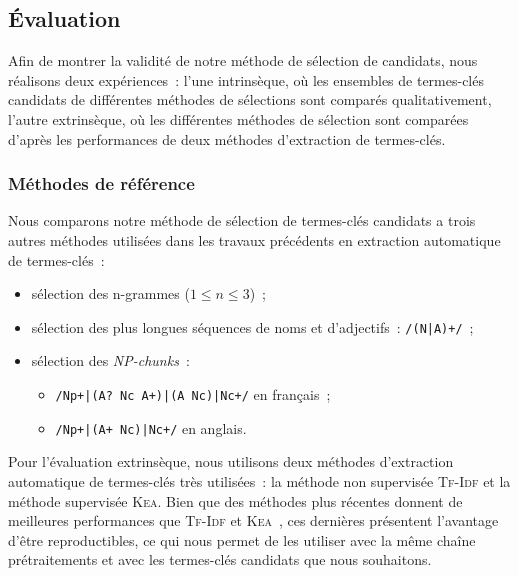     \subsection{Évaluation}
    \label{subsec:main:domain_independent_keyphrase_extraction-keyphrase_candidate_selection-evaluation}
      Afin de montrer la validité de notre méthode de sélection de candidats,
      nous réalisons deux expériences~: l'une intrinsèque, où les ensembles de
      termes-clés candidats de différentes méthodes de sélections sont comparés
      qualitativement, l'autre extrinsèque, où les différentes méthodes de
      sélection sont comparées d'après les performances de deux méthodes
      d'extraction de termes-clés.

      \subsubsection{Méthodes de référence}
      \label{subsubsec:main:domain_independent_keyphrase_extraction-keyphrase_candidate_selection-evaluation-baselines}
        Nous comparons notre méthode de sélection de termes-clés candidats a
        trois autres méthodes utilisées dans les travaux précédents en
        extraction automatique de termes-clés~:
        \begin{itemize}
          \item{sélection des n-grammes ($1 \leq n \leq 3$)~;}
          \item{sélection des plus longues séquences de noms et d'adjectifs~:
                \texttt{/(N|A)+/}~;}
          \item{sélection des \textit{NP-chunks}~:}
          \begin{itemize}
            \item{\texttt{/Np+|(A? Nc A+)|(A Nc)|Nc+/} en français~;}
            \item{\texttt{/Np+|(A+ Nc)|Nc+/} en anglais.}
          \end{itemize}
        \end{itemize}

        Pour l'évaluation extrinsèque, nous utilisons deux méthodes d'extraction
        automatique de termes-clés très utilisées~: la méthode non supervisée
        \textsc{Tf-Idf} et la méthode supervisée \textsc{Kea}. Bien que des
        méthodes plus récentes donnent de meilleures performances que
        \textsc{Tf-Idf} et \textsc{Kea}~\cite{kim2010semeval}, ces dernières
        présentent l'avantage d'être reproductibles, ce qui nous permet de les
        utiliser avec la même chaîne prétraitements et avec les termes-clés
        candidats que nous souhaitons.

